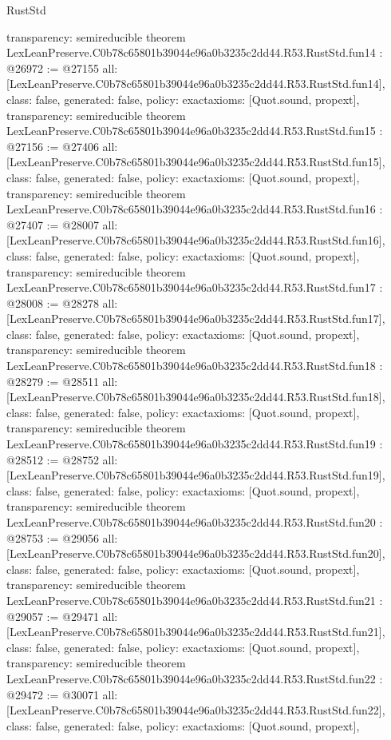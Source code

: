 \begin{lexlean}{RustStd}
\begin{coremodule}
{  transparency: semireducible
}
theorem LexLeanPreserve.C0b78c65801b39044e96a0b3235c2dd44.R53.RustStd.fun14 : @26972 := @27155 {
  all: [LexLeanPreserve.C0b78c65801b39044e96a0b3235c2dd44.R53.RustStd.fun14],
  class: false,
  generated: false,
  policy: exact{axioms: [Quot.sound, propext]},
  transparency: semireducible
}
theorem LexLeanPreserve.C0b78c65801b39044e96a0b3235c2dd44.R53.RustStd.fun15 : @27156 := @27406 {
  all: [LexLeanPreserve.C0b78c65801b39044e96a0b3235c2dd44.R53.RustStd.fun15],
  class: false,
  generated: false,
  policy: exact{axioms: [Quot.sound, propext]},
  transparency: semireducible
}
theorem LexLeanPreserve.C0b78c65801b39044e96a0b3235c2dd44.R53.RustStd.fun16 : @27407 := @28007 {
  all: [LexLeanPreserve.C0b78c65801b39044e96a0b3235c2dd44.R53.RustStd.fun16],
  class: false,
  generated: false,
  policy: exact{axioms: [Quot.sound, propext]},
  transparency: semireducible
}
theorem LexLeanPreserve.C0b78c65801b39044e96a0b3235c2dd44.R53.RustStd.fun17 : @28008 := @28278 {
  all: [LexLeanPreserve.C0b78c65801b39044e96a0b3235c2dd44.R53.RustStd.fun17],
  class: false,
  generated: false,
  policy: exact{axioms: [Quot.sound, propext]},
  transparency: semireducible
}
theorem LexLeanPreserve.C0b78c65801b39044e96a0b3235c2dd44.R53.RustStd.fun18 : @28279 := @28511 {
  all: [LexLeanPreserve.C0b78c65801b39044e96a0b3235c2dd44.R53.RustStd.fun18],
  class: false,
  generated: false,
  policy: exact{axioms: [Quot.sound, propext]},
  transparency: semireducible
}
theorem LexLeanPreserve.C0b78c65801b39044e96a0b3235c2dd44.R53.RustStd.fun19 : @28512 := @28752 {
  all: [LexLeanPreserve.C0b78c65801b39044e96a0b3235c2dd44.R53.RustStd.fun19],
  class: false,
  generated: false,
  policy: exact{axioms: [Quot.sound, propext]},
  transparency: semireducible
}
theorem LexLeanPreserve.C0b78c65801b39044e96a0b3235c2dd44.R53.RustStd.fun20 : @28753 := @29056 {
  all: [LexLeanPreserve.C0b78c65801b39044e96a0b3235c2dd44.R53.RustStd.fun20],
  class: false,
  generated: false,
  policy: exact{axioms: [Quot.sound, propext]},
  transparency: semireducible
}
theorem LexLeanPreserve.C0b78c65801b39044e96a0b3235c2dd44.R53.RustStd.fun21 : @29057 := @29471 {
  all: [LexLeanPreserve.C0b78c65801b39044e96a0b3235c2dd44.R53.RustStd.fun21],
  class: false,
  generated: false,
  policy: exact{axioms: [Quot.sound, propext]},
  transparency: semireducible
}
theorem LexLeanPreserve.C0b78c65801b39044e96a0b3235c2dd44.R53.RustStd.fun22 : @29472 := @30071 {
  all: [LexLeanPreserve.C0b78c65801b39044e96a0b3235c2dd44.R53.RustStd.fun22],
  class: false,
  generated: false,
  policy: exact{axioms: [Quot.sound, propext]},
}
\end{coremodule}
\end{lexlean}
